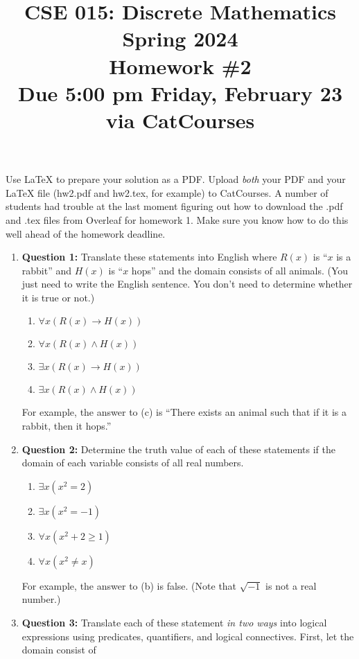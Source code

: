 \documentclass[11pt]{article}
\begin{document}
\title{CSE 015: Discrete Mathematics\\
Spring 2024\\
Homework \#2\\
Due 5:00 pm Friday, February 23 via CatCourses}
\date{}
\maketitle
\noindent Use LaTeX to prepare your solution as a PDF. Upload \emph{both} your PDF
and your LaTeX file (hw2.pdf and hw2.tex, for example) to CatCourses. A number of
students had trouble at the last moment figuring out how to download the .pdf
and .tex files from Overleaf for homework 1. Make sure you know how to do this well
ahead of the homework deadline.
\begin{enumerate}
\item
\textbf{Question 1:}
Translate these statements into English where $R(x)$ is ``$x$ is a rabbit'' and
$H(x)$ is ``$x$ hops'' and the domain consists of all animals. (You just need to
write the English sentence. You don't need to determine whether it is true or not.)
\begin{enumerate}[label=(\alph*)]
\item $\forall x (R(x) \rightarrow H(x))$
\item $\forall x (R(x) \land H(x))$
\item $\exists x (R(x) \rightarrow H(x))$
\item $\exists x (R(x) \land H(x))$
\end{enumerate}
For example, the answer to (c) is ``There exists an animal such that if it is a
rabbit, then it hops.''
\item
\textbf{Question 2:}
Determine the truth value of each of these statements if the domain of each
variable consists of all real numbers.
\begin{enumerate}[label=(\alph*)]
\item $\exists x (x^2 = 2)$
\item $\exists x (x^2 = -1)$
\item $\forall x (x^2 + 2 \geq 1)$
\item $\forall x (x^2 \neq x)$
\end{enumerate}
For example, the answer to (b) is false. (Note that $\sqrt{-1}$ is not a real
number.)
\item
\textbf{Question 3:}
Translate each of these statement \emph{in two ways} into logical expressions using
predicates, quantifiers, and logical connectives. First, let the domain consist of

\end{enumerate}
\end{document}
